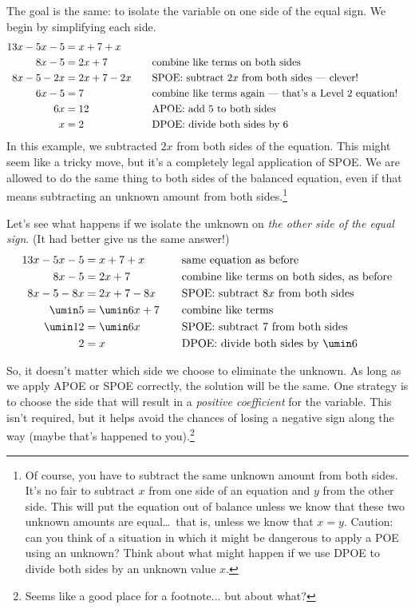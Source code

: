 The goal is the same: to isolate the variable on one side of the equal sign. We begin by simplifying each side.
\[\begin{aligned}
13x-5x-5 &= x+7+x\\
8x-5 &= 2x+7
&&\text{\quad combine like terms on both sides}\\
8x-5 - 2x &= 2x+7 - 2x
&&\text{\quad SPOE: subtract $2x$ from both sides --- clever!}\\
6x-5 &= 7
&&\text{\quad combine like terms again --- that's a Level 2 equation!}\\
6x &= 12
&&\text{\quad APOE: add 5 to both sides}\\
x &= 2
&&\text{\quad DPOE: divide both sides by 6}
\end{aligned}\]
In this example, we subtracted $2x$ from both sides of the equation. This might seem like a tricky move, but it's a completely legal application of SPOE. We are allowed to do the same thing to both sides of the balanced equation, even if that means subtracting an unknown amount from both sides.\footnote{Of course, you have to subtract the same unknown amount from both sides. It's no fair to subtract $x$ from one side of an equation and $y$ from the other side. This will put the equation out of balance unless we know that these two unknown amounts are equal\ldots\ that is, unless we know that $x=y$. Caution: can you think of a situation in which it might be dangerous to apply a POE using an unknown? Think about what might happen if we use DPOE to divide both sides by an unknown value $x$.}

Let's see what happens if we isolate the unknown on \textit{the other side of the equal sign}. (It had better give us the same answer!)
\[\begin{aligned}
13x-5x-5 &= x+7+x
&&\text{\quad same equation as before}\\
8x-5 &= 2x+7
&&\text{\quad combine like terms on both sides, as before}\\
8x-5 - 8x &= 2x+7 - 8x
&&\text{\quad SPOE: subtract $8x$ from both sides}\\
\umin5 &= \umin6x + 7
&&\text{\quad combine like terms}\\
\umin12 &= \umin6x
&&\text{\quad SPOE: subtract 7 from both sides}\\
2 &= x
&&\text{\quad DPOE: divide both sides by $\umin6$}
\end{aligned}\]

So, it doesn't matter which side we choose to eliminate the unknown. As long as we apply APOE or SPOE correctly, the solution will be the same. One strategy is to choose the side that will result in a \textit{positive coefficient} for the variable. This isn't required, but it helps avoid the chances of losing a negative sign along the way (maybe that's happened to you).\footnote{Seems like a good place for a footnote... but about what?}

